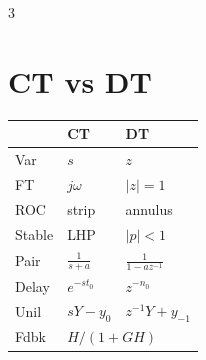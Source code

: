 \documentclass[11pt]{extarticle}
\begin{document}
\begin{paracol}{3}
\section*{CT vs DT}
\begin{tabular}{@{}l l l@{}}
\toprule
 & CT & DT \\
\midrule
Var & $s$ & $z$ \\
FT & $j\omega$ & $|z|{=}1$ \\
ROC & strip & annulus \\
Stable & LHP & $|p|{<}1$ \\
Pair & $\tfrac{1}{s+a}$ & $\tfrac{1}{1-az^{-1}}$ \\
Delay & $e^{-st_0}$ & $z^{-n_0}$ \\
Unil & $sY{-}y_0$ & $z^{-1}Y{+}y_{-1}$ \\
Fdbk & \multicolumn{2}{l}{$H/(1{+}GH)$} \\
\bottomrule
\end{tabular}

\end{paracol}
\end{document}
